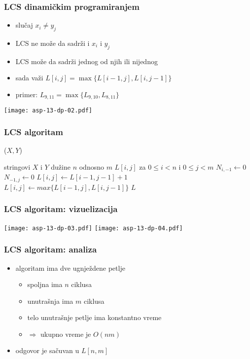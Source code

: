 \documentclass[compress,aspectratio=169]{beamer}
\begin{document}
\begin{frame}[fragile]
  \frametitle{LCS dinamičkim programiranjem}
  \begin{itemize}
    \item slučaj $x_{i} \neq y_{j}$
    \item LCS ne može da sadrži i $x_{i}$ i $y_{j}$
    \item LCS može da sadrži jednog od njih ili nijednog
    \item sada važi $L[i,j] = \max\{L[i-1,j], L[i,j-1]\}$
    \item primer: $L_{9,11} = \max\{L_{9,10}, L_{8,11}\}$
  \end{itemize}
  \begin{center}
    \texttt{[image: asp-13-dp-02.pdf]}
  \end{center}
\end{frame}

\begin{frame}
  \frametitle{LCS algoritam}
  ($X,Y$)
  \begin{algorithmic}
    \REQUIRE stringovi $X$ i $Y$ dužine $n$ odnosno $m$
    \ENSURE $L[i,j]$ za $0\leq i<n$ i $0\leq j<m$
      \STATE $N_{i,-1} \leftarrow 0$
    \ENDFOR
      \STATE $N_{-1,j} \leftarrow 0$
    \ENDFOR
          \STATE $L[i,j] \leftarrow L[i-1,j-1]+1$
        \ELSE
          \STATE $L[i,j] \leftarrow max\{L[i-1,j], L[i,j-1]\}$
        \ENDIF
      \ENDFOR
    \ENDFOR
    \RETURN $L$
  \end{algorithmic}    
\end{frame}

\begin{frame}[fragile]
  \frametitle{LCS algoritam: vizuelizacija}
  \begin{center}
    \texttt{[image: asp-13-dp-03.pdf]}
    \texttt{[image: asp-13-dp-04.pdf]}
  \end{center}
\end{frame}

\begin{frame}[fragile]
  \frametitle{LCS algoritam: analiza}
  \begin{itemize}
    \item algoritam ima dve ugnježdene petlje
    \begin{itemize}
      \item spoljna ima $n$ ciklusa
      \item unutrašnja ima $m$ ciklusa
      \item telo unutrašnje petlje ima konstantno vreme
      \item $\Rightarrow$ ukupno vreme je $O(nm)$
    \end{itemize}
    \item odgovor je sačuvan u $L[n,m]$
  \end{itemize}
\end{frame}
\end{document}
